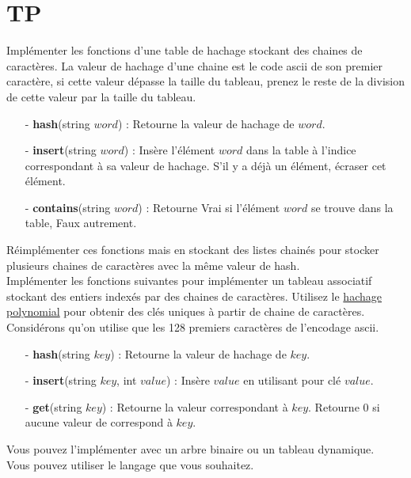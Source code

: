 \documentclass[11pt]{extarticle}
\begin{document}
\section{TP}
\noindent
Implémenter les fonctions d'une table de hachage stockant des chaines de caractères. La valeur de hachage d'une chaine est le code ascii de son premier caractère, si cette valeur dépasse la taille du tableau, prenez le reste de la division de cette valeur par la taille du tableau.
\begin{itemize}
\item[ - \textbf{hash}(string $word$)]: Retourne la valeur de hachage de $word$.
\item[ - \textbf{insert}(string $word$)]: Insère l'élément $word$ dans la table à l'indice correspondant à sa valeur de hachage. S'il y a déjà un élément, écraser cet élément.
\item[ - \textbf{contains}(string $word$)]: Retourne Vrai si l'élément $word$ se trouve dans la table, Faux autrement.
\end{itemize}
Réimplémenter ces fonctions mais en stockant des listes chainés pour stocker plusieurs chaines de caractères avec la même valeur de hash. \vspace{0.5cm}\\
Implémenter les fonctions suivantes pour implémenter un tableau associatif stockant des entiers indexés par des chaines de caractères. Utilisez le \href{https://en.wikipedia.org/wiki/Rolling_hash}{hachage polynomial} pour obtenir des clés uniques à partir de chaine de caractères. Considérons qu'on utilise que les 128 premiers caractères de l'encodage ascii.
\begin{itemize}
\item[ - \textbf{hash}(string $key$)]: Retourne la valeur de hachage de $key$.
\item[ - \textbf{insert}(string $key$, int $value$)]: Insère $value$ en utilisant pour clé $value$.
\item[ - \textbf{get}(string $key$)]: Retourne la valeur correspondant à $key$. Retourne 0 si aucune valeur de correspond à $key$.
\end{itemize}
Vous pouvez l'implémenter avec un arbre binaire ou un tableau dynamique.\\
Vous pouvez utiliser le langage que vous souhaitez.
\end{document}
